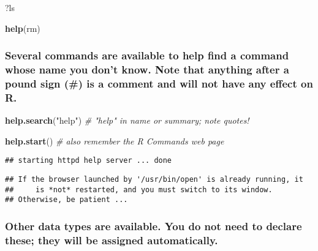 \documentclass[]{article}
\newenvironment{Shaded}{\begin{snugshade}}{\end{snugshade}}
\newcommand{\KeywordTok}[1]{\textcolor[rgb]{0.13,0.29,0.53}{\textbf{#1}}}
\newcommand{\StringTok}[1]{\textcolor[rgb]{0.31,0.60,0.02}{#1}}
\newcommand{\CommentTok}[1]{\textcolor[rgb]{0.56,0.35,0.01}{\textit{#1}}}
\newcommand{\NormalTok}[1]{#1}
\begin{document}
\begin{Shaded}
\begin{Highlighting}[]
\NormalTok{?ls}
\end{Highlighting}
\end{Shaded}

\begin{Shaded}
\begin{Highlighting}[]
\KeywordTok{help}\NormalTok{(rm)}
\end{Highlighting}
\end{Shaded}

\subsubsection{Several commands are available to help find a command
whose name you don't know. Note that anything after a pound sign (\#) is
a comment and will not have any effect on
R.}\label{several-commands-are-available-to-help-find-a-command-whose-name-you-dont-know.-note-that-anything-after-a-pound-sign-is-a-comment-and-will-not-have-any-effect-on-r.}

\begin{Shaded}
\begin{Highlighting}[]
\KeywordTok{help.search}\NormalTok{(}\StringTok{"help"}\NormalTok{) }\CommentTok{# "help" in name or summary; note quotes!}
\end{Highlighting}
\end{Shaded}

\begin{Shaded}
\begin{Highlighting}[]
\KeywordTok{help.start}\NormalTok{() }\CommentTok{# also remember the R Commands web page}
\end{Highlighting}
\end{Shaded}

\begin{verbatim}
## starting httpd help server ... done
\end{verbatim}

\begin{verbatim}
## If the browser launched by '/usr/bin/open' is already running, it
##     is *not* restarted, and you must switch to its window.
## Otherwise, be patient ...
\end{verbatim}

\subsubsection{Other data types are available. You do not need to
declare these; they will be assigned
automatically.}\label{other-data-types-are-available.-you-do-not-need-to-declare-these-they-will-be-assigned-automatically.}
\end{document}
